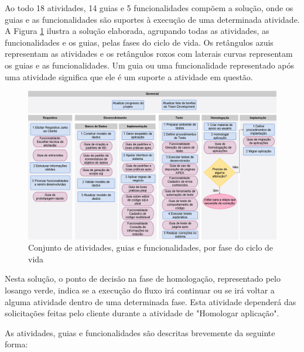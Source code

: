 Ao todo 18 atividades, 14 guias e 5 funcionalidades compõem a solução, onde os guias e as funcionalidades são suportes à execução de uma determinada atividade. A Figura \ref{atividades_solucao} ilustra a solução elaborada, agrupando todas as atividades, as funcionalidades e os guias, pelas fases do ciclo de vida. Os retângulos azuis representam as atividades e os retângulos roxos com laterais curvas representam os guias e as funcionalidades. Um guia ou uma funcionalidade representado após uma atividade significa que ele é um suporte a atividade em questão.
\clearpage

\begin{landscape}
\begin{figure}[!htb]
	\centering
		\includegraphics[scale=0.4]{figuras/fluxograma_solucao}
	\caption{Conjunto de atividades, guias e funcionalidades, por fase do ciclo de vida}
	\label{atividades_solucao}
\end{figure}
\end{landscape}

Nesta solução, o ponto de decisão na fase de homologação, representado pelo losango verde, indica se a execução do fluxo irá continuar ou se irá voltar a alguma atividade dentro de uma determinada fase. Esta atividade dependerá das solicitações feitas pelo cliente durante a atividade de "Homologar aplicação".

As atividades, guias e funcionalidades são descritas brevemente da seguinte forma:

